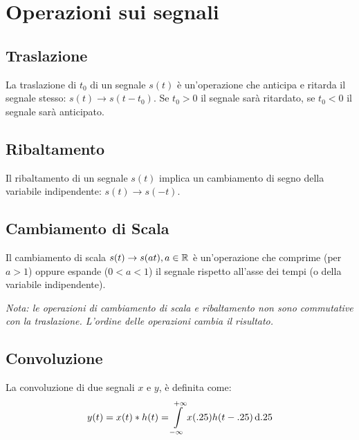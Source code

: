 
%
%

\section{Operazioni sui segnali}
\subsection{Traslazione}
La traslazione di $t_0$ di un segnale $s(t)$ \`e un'operazione che anticipa e ritarda il segnale stesso:
$s(t) \to s(t-t_0)$. Se $t_0>0$ il segnale sar\`a ritardato, se $t_0<0$ il segnale sar\`a anticipato.
\subsection{Ribaltamento}
Il ribaltamento di un segnale $s(t)$ implica un cambiamento di segno della variabile indipendente: $s(t) \to s(-t)$.
\subsection{Cambiamento di Scala}
Il cambiamento di scala $s(t)\to s(a t), a\in\mathbb{R}$ \`e un'operazione che comprime (per $a>1$) oppure espande ($0<a<1$) il segnale rispetto all'asse dei tempi (o della variabile indipendente).

\textit{Nota: le operazioni di cambiamento di scala e ribaltamento non sono commutative con la traslazione. L'ordine delle operazioni cambia il risultato.}





\subsection{Convoluzione}
La convoluzione di due segnali $x$ e $y$, \`e definita come:
\[y(t)=x(t)\ast  h(t)=\int\limits_{-\infty}^{+\infty}{x(.25)h(t-.25)}{\,\mathop{}\!\mathrm{d}{.25}}\]
